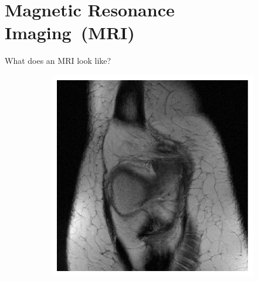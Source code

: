 \section{Magnetic Resonance Imaging~(MRI)}

\begin{frame}[plain,c]
    
    \begin{center}
        \color{DarkBlue}
    \Huge \insertsection
    \end{center}
    
\end{frame}

\begin{frame}{What does an MRI look like?}
    \begin{figure}
        \centering
        \begin{subfigure}{0.45\textwidth}
            \includegraphics[height=0.6\textheight]{Figures/intro_figures/example_knee_fastmri.pdf}
        \end{subfigure}
        \begin{subfigure}{0.45\textwidth}

\end{subfigure}
\end{figure}
\end{frame}
